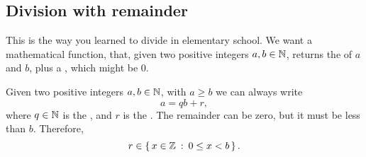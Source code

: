 \begin{definition}
    
\end{definition}

\subsection{Division with remainder}

This is the way you learned to divide in elementary school. We want a
mathematical function, that, given two positive integers $a, b \in
\mathbb{N}$, returns the  of $a$ and $b$, plus a
, which might be $0$.

\begin{lemma}
  Given two positive integers $a, b \in \mathbb{N}$, with $a \ge b$ we can
  always write $$a = qb + r,$$ where $q \in \mathbb{N}$ is the
  , and $r$ is the . The remainder can
  be zero, but it must be less than $b$. Therefore,
  $$r \in \left\{\, x \in \mathbb{Z} \::\: 0 \le x < b \,\right\}.$$
\end{lemma}
